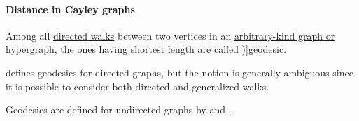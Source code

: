 \paragraph{Distance in Cayley graphs}

\begin{definition}\label{def:graph_geodesic}
  Among all \hyperref[def:graph_walk/directed]{directed walks} between two vertices in an \hyperref[rem:arbitrary_kind_graph]{arbitrary-kind graph or hypergraph}, the ones having shortest length are called \term[ru=геодезические (цепи) (\cite[\S 7.2.5]{Новиков2013ДискретнаяМатематика})]{geodesic}.
\end{definition}
\begin{comments}
  \item {} defines geodesics for directed graphs, but the notion is generally ambiguous since it is possible to consider both directed and generalized walks.

  Geodesics are defined for undirected graphs by  and .
\end{comments}

